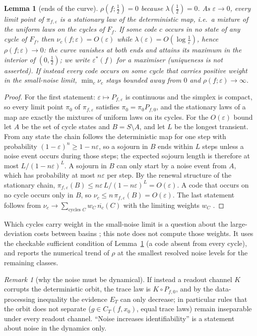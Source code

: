 \documentclass[11pt,a4paper]{article}
\newtheorem{lemma}{Lemma}
\theoremstyle{remark}
\newtheorem{remark}{Remark}
\newcommand{\eps}{\varepsilon}
\begin{document}
\begin{lemma}[ends of the curve]\label{lem:ends}
$\rho(f;\tfrac12)=0$ because $\lambda(\tfrac12)=0$. As $\eps\to0$, every limit point of $\pi_{f,\eps}$ is a stationary law of the deterministic map, i.e.\ a mixture of the uniform laws on the cycles of $F_f$. If some code $c$ occurs in no state of any cycle of $F_f$, then $\nu_c(f;\eps)=O(\eps)$ while $\lambda(\eps)=O(\log\frac1\eps)$, hence $\rho(f;\eps)\to0$: the curve vanishes at both ends and attains its maximum in the interior of $(0,\tfrac12)$; we write $\eps^*(f)$ for a maximiser (uniqueness is not asserted). If instead every code occurs on some cycle that carries positive weight in the small-noise limit, $\min_c\nu_c$ stays bounded away from $0$ and $\rho(f;\eps)\to\infty$.
\end{lemma}
\begin{proof}
For the first statement: $\eps\mapsto P_{f,\eps}$ is continuous and the simplex is compact, so every limit point $\pi_0$ of $\pi_{f,\eps}$ satisfies $\pi_0=\pi_0P_{f,0}$, and the stationary laws of a map are exactly the mixtures of uniform laws on its cycles. For the $O(\eps)$ bound let $A$ be the set of cycle states and $B=S\setminus A$, and let $L$ be the longest transient. From any state the chain follows the deterministic map for one step with probability $(1-\eps)^n\ge1-n\eps$, so a sojourn in $B$ ends within $L$ steps unless a noise event occurs during those steps; the expected sojourn length is therefore at most $L/(1-n\eps)^L$. A sojourn in $B$ can only start by a noise event from $A$, which has probability at most $n\eps$ per step. By the renewal structure of the stationary chain, $\pi_{f,\eps}(B)\le n\eps\,L/(1-n\eps)^L=O(\eps)$. A code that occurs on no cycle occurs only in $B$, so $\nu_c\le n\,\pi_{f,\eps}(B)=O(\eps)$. The last statement follows from $\nu_c\to\sum_{\text{cycles }C}w_C\,\overline{n_c}(C)$ with the limiting weights $w_C$ \citep{FreidlinWentzell}.
\end{proof}

Which cycles carry weight in the small-noise limit is a question about the large-deviation costs between basins \citep{FreidlinWentzell}; this note does not compute those weights. It uses the checkable sufficient condition of Lemma~\ref{lem:ends} (a code absent from every cycle), and reports the numerical trend of $\rho$ at the smallest resolved noise levels for the remaining classes.

\begin{remark}[why the noise must be dynamical]\label{rem:dyn}
If instead a readout channel $K$ corrupts the deterministic orbit, the trace law is $K\circ P_{f,0}$, and by the data-processing inequality the evidence $E_T$ can only decrease; in particular rules that the orbit does not separate ($g\in C_T(f,x_0)$, equal trace laws) remain inseparable under every readout channel. ``Noise increases identifiability'' is a statement about noise in the dynamics only.
\end{remark}
\end{document}
